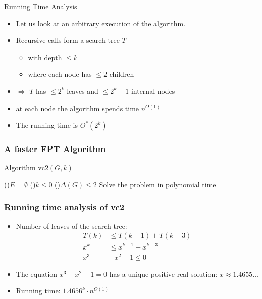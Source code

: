 \begin{frame}{Running Time Analysis}
	\begin{itemize}
		\item Let us look at an arbitrary execution of the algorithm.
		\item Recursive calls form a \alert{search tree} $T$
		      \begin{itemize}
			      \item with depth $\le k$
			      \item where each node has $\le 2$ children
		      \end{itemize}
		\item $\Rightarrow$ $T$ has $\le 2^k$ leaves and $\le 2^{k}-1$ internal nodes
		\item at each node the algorithm spends time $n^{O(1)}$
		\item The running time is $O^*(2^k)$
	\end{itemize}
\end{frame}



\begin{frame}
	\frametitle{A faster FPT Algorithm}

	\pause{}

	\begin{algorithm}[H]
		\SetArgSty{}

		\alert{Algorithm $\text{vc2}(G,k)$}\;
		\BlankLine{}

		\If(){$E = \emptyset$} {
		}
		\ElseIf(){$k \le 0$} {
		}
		\ElseIf(){$\Delta(G) \le 2$} {
			Solve the problem in polynomial time\;
		}
	\end{algorithm}

\end{frame}


\begin{frame}
	\frametitle{Running time analysis of vc2}

	\begin{itemize}
		\item Number of leaves of the search tree:
		      \begin{align*}
			      T(k) & \le T(k-1)+T(k-3)   \\
			      x^k  & \le x^{k-1}+x^{k-3} \\
			      x^3  & - x^2 - 1 \le 0
		      \end{align*}
		\item The equation $x^3 - x^2 - 1 = 0$ has a unique positive real solution: $x \approx 1.4655\ldots$
		\item Running time: $1.4656^k \cdot n^{O(1)}$
	\end{itemize}

\end{frame}

